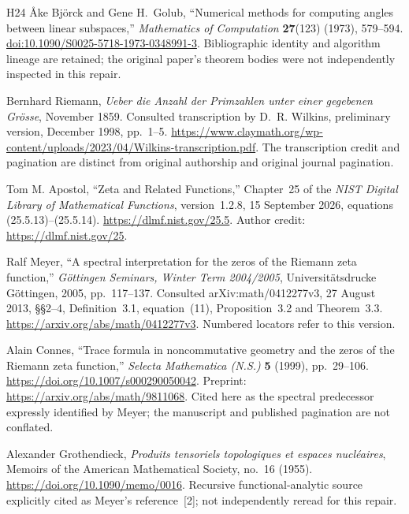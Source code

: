 \documentclass[11pt,a4paper]{article}
\begin{document}
\begin{thebibliography}{H24}
\AA ke Bj\"orck and Gene H.~Golub,
``Numerical methods for computing angles between linear subspaces,''
\emph{Mathematics of Computation} \textbf{27}(123) (1973), 579--594.
\href{https://doi.org/10.1090/S0025-5718-1973-0348991-3}{doi:10.1090/S0025-5718-1973-0348991-3}.
Bibliographic identity and algorithm lineage are retained; the original
paper's theorem bodies were not independently inspected in this repair.

Bernhard Riemann, \emph{Ueber die Anzahl der Primzahlen unter einer
gegebenen Gr\"osse}, November 1859. Consulted transcription by
D.~R. Wilkins, preliminary version, December 1998, pp.~1--5.
\url{https://www.claymath.org/wp-content/uploads/2023/04/Wilkins-transcription.pdf}.
The transcription credit and pagination are distinct from original authorship
and original journal pagination.

Tom M. Apostol, ``Zeta and Related Functions,'' Chapter~25 of the
\emph{NIST Digital Library of Mathematical Functions},
version~1.2.8, 15 September 2026, equations (25.5.13)--(25.5.14).
\url{https://dlmf.nist.gov/25.5}.
Author credit: \url{https://dlmf.nist.gov/25}.

Ralf Meyer, ``A spectral interpretation for the zeros of the Riemann
zeta function,'' \emph{G\"ottingen Seminars, Winter Term 2004/2005},
Universit\"atsdrucke G\"ottingen, 2005, pp.~117--137.
Consulted arXiv:math/0412277v3, 27 August 2013,
\S\S2--4, Definition~3.1, equation~(11), Proposition~3.2 and Theorem~3.3.
\url{https://arxiv.org/abs/math/0412277v3}.
Numbered locators refer to this version.

Alain Connes, ``Trace formula in noncommutative geometry and the zeros
of the Riemann zeta function,'' \emph{Selecta Mathematica (N.S.)}
\textbf{5} (1999), pp.~29--106.
\url{https://doi.org/10.1007/s000290050042}.
Preprint: \url{https://arxiv.org/abs/math/9811068}.
Cited here as the spectral predecessor expressly identified by Meyer;
the manuscript and published pagination are not conflated.

Alexander Grothendieck, \emph{Produits tensoriels topologiques et
espaces nucl\'eaires}, Memoirs of the American Mathematical Society,
no.~16 (1955). \url{https://doi.org/10.1090/memo/0016}.
Recursive functional-analytic source explicitly cited as Meyer's
reference~[2]; not independently reread for this repair.


\end{thebibliography}
\end{document}
